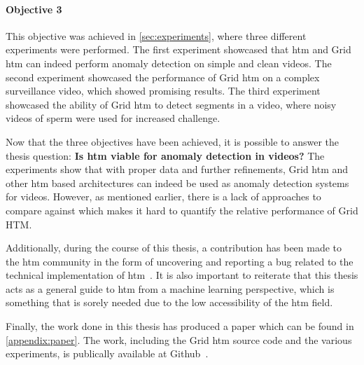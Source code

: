 \paragraph*{Objective 3} \emph{}
\par
This objective was achieved in \autoref{sec:experiments}, where three different experiments were performed. The first experiment showcased that \gls*{htm} and Grid \gls*{htm} can indeed perform anomaly detection on simple and clean videos. The second experiment showcased the performance of Grid \gls*{htm} on a complex surveillance video, which showed promising results. The third experiment showcased the ability of Grid \gls*{htm} to detect segments in a video, where noisy videos of sperm were used for increased challenge.
\par
Now that the three objectives have been achieved, it is possible to answer the thesis question: \textbf{Is \gls*{htm} viable for anomaly detection in videos?} The experiments show that with proper data and further refinements, Grid \gls*{htm} and other \gls*{htm} based architectures can indeed be used as anomaly detection systems for videos. However, as mentioned earlier, there is a lack of approaches to compare against which makes it hard to quantify the relative performance of Grid HTM.
\par
Additionally, during the course of this thesis, a contribution has been made to the  \gls*{htm} community in the form of uncovering and reporting a bug related to the technical implementation of  \gls*{htm}~\cite{github_contrib}. It is also important to reiterate that this thesis acts as a general guide to \gls*{htm} from a machine learning perspective, which is something that is sorely needed due to the low accessibility of the \gls*{htm} field.
\par
Finally, the work done in this thesis has produced a paper which can be found in \autoref{appendix:paper}. The work, including the Grid \gls*{htm} source code and the various experiments, is publically available at Github~\cite{master_thesis_github}.
